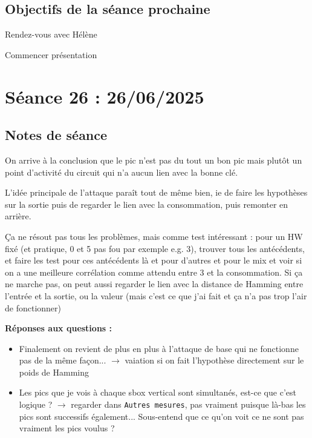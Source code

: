 \documentclass[12pt]{article}
\newcommand{\cmark}{\ding{51}}%
\newcommand{\done}{\rlap{$\square$}{\raisebox{2pt}{\large\hspace{1pt}\cmark}}%
	\hspace{-2.5pt}}
\begin{document}
	\subsection{Objectifs de la séance prochaine}
	\begin{todolist}
		\item[\done] Rendez-vous avec Hélène
		\item[\done] Commencer présentation
	\end{todolist}
	
	
	\section{Séance 26 : 26/06/2025}
	\subsection{Notes de séance}
	On arrive à la conclusion que le pic n'est pas du tout un bon pic mais plutôt un point d'activité du circuit qui n'a aucun lien avec la bonne clé.
	
	L'idée principale de l'attaque paraît tout de même bien, ie de faire les hypothèses sur la sortie puis de regarder le lien avec la consommation, puis remonter en arrière.
	
	\c{C}a ne résout pas tous les problèmes, mais comme test intéressant : pour un HW fixé (et pratique, 0 et 5 pas fou par exemple e.g. 3), trouver tous les antécédents, et faire les test pour ces antécédents là et pour d'autres et pour le mix et voir si on a une meilleure corrélation comme attendu entre 3 et la consommation. Si ça ne marche pas, on peut aussi regarder le lien avec la distance de Hamming entre l'entrée et la sortie, ou la valeur (mais c'est ce que j'ai fait et ça n'a pas trop l'air de fonctionner)
	
	\textbf{Réponses aux questions :}
	\begin{itemize}
		\item Finalement on revient de plus en plus à l'attaque de base qui ne fonctionne pas de la même façon... $\rightarrow$ vaiation si on fait l'hypothèse directement sur le poids de Hamming
		\item Les pics que je vois à chaque sbox vertical sont simultanés, est-ce que c'est logique ? $\rightarrow$ regarder dans \verb|Autres mesures|, pas vraiment puisque là-bas les pics sont successifs également... Sous-entend que ce qu'on voit ce ne sont pas vraiment les pics voulus ?
	\end{itemize}
	
\end{document}

